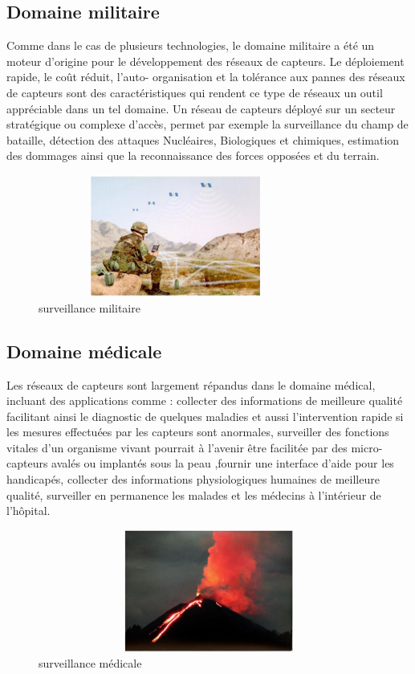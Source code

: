 \subsection{Domaine militaire}
Comme dans le cas de plusieurs technologies, le domaine militaire a été un moteur d'origine 	pour le développement des réseaux de capteurs. Le déploiement rapide, le coût réduit, l'auto-	organisation et la tolérance aux pannes des réseaux de capteurs sont des caractéristiques qui 	rendent ce type de réseaux un outil appréciable dans un tel domaine. \cite{mekidicheetude}
	Un réseau de capteurs déployé sur un secteur stratégique ou complexe d'accès, permet par 	exemple la surveillance du champ de bataille, détection des attaques Nucléaires, Biologiques 	et chimiques, estimation des dommages ainsi que la reconnaissance des forces opposées et 	du terrain. 
\begin{figure}[h]
	\centering
	\includegraphics[width=9cm,height=4cm]{Chap1/6.png}
	\caption{surveillance militaire}
	\label{fig:SM}
\end{figure}

\subsection{Domaine médicale}
Les réseaux de capteurs sont largement répandus dans le domaine médical, incluant des 	applications comme : collecter des informations de meilleure qualité facilitant ainsi le diagnostic de quelques maladies et aussi l’intervention rapide si les mesures effectuées par 	les capteurs sont anormales, surveiller des fonctions vitales d'un organisme vivant pourrait à 	l'avenir être facilitée par des micro-capteurs avalés ou implantés sous la peau ,fournir une 	interface d'aide pour les handicapés, collecter des informations physiologiques humaines de 	meilleure qualité, surveiller en permanence les malades et les médecins à l'intérieur de 	l'hôpital.
\begin{figure}[h]
	\centering
	\includegraphics[width=12cm,height=4cm]{Chap1/7.png}
	\caption{surveillance médicale}
	\label{fig:SM}
\end{figure}

